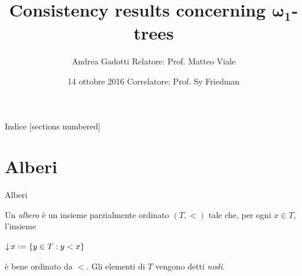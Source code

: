 \documentclass{beamer}
\title{Consistency results concerning $\pmb{\omega_1}$-trees}
\author{Andrea Gadotti \hfill Relatore: Prof. Matteo Viale}
\date{14 ottobre 2016 \hfill Correlatore: Prof. Sy Friedman}
\institute{Università di Torino}
\theoremstyle{num.custom-title}
\theoremstyle{custom-title}
\DeclareMathOperator{\down}{\downarrow}
\newcommand*{\defeq}{\mathrel{\rlap{%
                     \raisebox{0.3ex}{$\cdot$}}%
                     \raisebox{-0.3ex}{$\cdot$}}%
                     =}
\begin{document}
\setlength{\abovedisplayskip}{1pt}
\setlength{\belowdisplayskip}{1pt}
\setlength{\abovedisplayshortskip}{1pt}
\setlength{\belowdisplayshortskip}{1pt}

\maketitle


\begin{frame}{Indice}
[sections numbered]
\tableofcontents[hideallsubsections]
\end{frame}

\section{Alberi}

\begin{frame}{Alberi}

\begin{definition}
Un \emph{albero} è un insieme parzialmente ordinato $(T,<)$ tale che, per ogni $x \in T$, l'insieme
\begin{center}
$\down x \defeq \{y \in T : y < x\}$
\end{center}
è bene ordinato da $<$. Gli elementi di $T$ vengono detti \emph{nodi}. 
\end{definition}

\end{frame}
\end{document}
